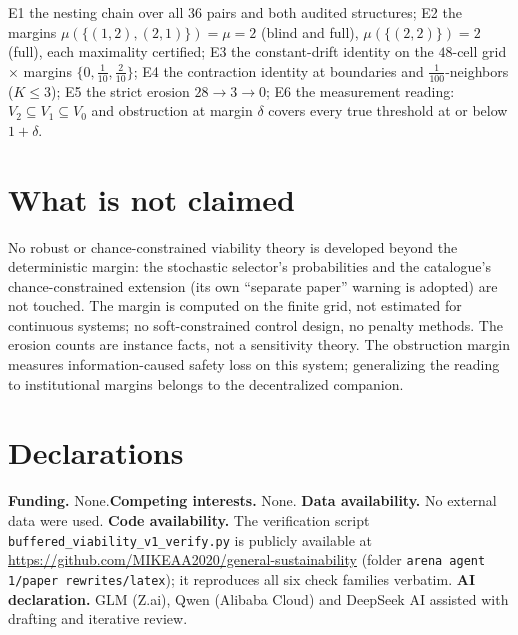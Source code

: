 \documentclass[10pt,twocolumn]{article}
\theoremstyle{definition}
\begin{document}
E1 the nesting chain over all $36$ pairs and both audited structures;
E2 the margins $\mu(\{(1,2),(2,1)\})=\mu=2$ (blind and full),
$\mu(\{(2,2)\})=2$ (full), each maximality certified; E3 the
constant-drift identity on the $48$-cell grid $\times$ margins
$\{0,\tfrac1{10},\tfrac2{10}\}$; E4 the contraction identity at
boundaries and $\tfrac1{100}$-neighbors ($K\le3$); E5 the strict erosion
$28\to3\to0$; E6 the measurement reading: $V_2\subseteq V_1\subseteq
V_0$ and obstruction at margin $\delta$ covers every true threshold at
or below $1+\delta$.

\section{What is not claimed}

No robust or chance-constrained viability theory is developed beyond the
deterministic margin: the stochastic selector's probabilities and the
catalogue's chance-constrained extension (its own ``separate paper''
warning is adopted) are not touched. The margin is computed on the finite
grid, not estimated for continuous systems; no soft-constrained control
design, no penalty methods. The erosion counts are instance facts, not a
sensitivity theory. The obstruction margin measures information-caused
safety loss on this system; generalizing the reading to institutional
margins belongs to the decentralized companion.


\section*{Declarations}
\textbf{Funding.} None.\quad \textbf{Competing interests.} None.\quad
\textbf{Data availability.} No external data were used.\quad
\textbf{Code availability.} The verification script
\texttt{buffered\_viability\_v1\_verify.py} is publicly available at
\url{https://github.com/MIKEAA2020/general-sustainability} (folder
\texttt{arena agent 1/paper rewrites/latex}); it reproduces all six check
families verbatim.\quad
\textbf{AI declaration.} GLM (Z.ai), Qwen (Alibaba Cloud) and DeepSeek AI
assisted with drafting and iterative review.
\end{document}
